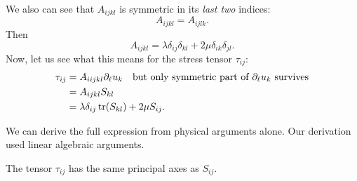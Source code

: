 \begin{node}
We also can see that $A_{ijkl}$ is symmetric in its \emph{last two} indices:
\begin{equation}
A_{ijkl}=A_{ijlk}.
\end{equation}
Then
\begin{equation}
A_{ijkl}=\lambda\delta_{ij}\delta_{kl}+2\mu\delta_{ik}\delta_{jl}.
\end{equation}
Now, let us see what this means for the stress tensor $\tau_{ij}$:
\begin{subequations}
  \begin{align}
\tau_{ij} &= A_{iijkl}\partial_{\ell}u_{k}\quad\mbox{but only
  symmetric part of $\partial_{\ell}u_{k}$ survives}\\
&=A_{ijkl}S_{kl}\\
&=\lambda\delta_{ij}\operatorname{tr}(S_{kl})+2\mu S_{ij}.
  \end{align}
\end{subequations}
\end{node}

\begin{remark}
We can derive the full expression from physical arguments alone. Our
derivation used linear algebraic arguments.
\end{remark}

\begin{remark}
The tensor $\tau_{ij}$ has the same principal axes as $S_{ij}$.
\end{remark}

